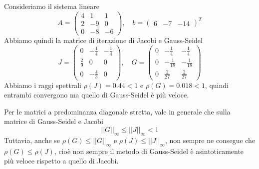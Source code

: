 \documentclass[a4paper]{article}
\begin{document}
\begin{snippetexample}{}
    Consideriamo il sistema lineare
    \[
        A =
        \begin{pmatrix}
            4 & 1 & 1 \\
            2 & -9 & 0 \\
            0 & -8 & -6
        \end{pmatrix}, \quad b=
        \begin{pmatrix}
            6 & -7 & -14
        \end{pmatrix}^T
    \]
    Abbiamo quindi la matrice di iterazione di Jacobi e Gauss-Seidel
    \[
        J =
        \begin{pmatrix}
            0 & -\frac14 & -\frac14 \\
            \frac29 & 0 & 0 \\
            0 & -\frac43 & 0
        \end{pmatrix}, \quad
        G =
        \begin{pmatrix}
            0 & -\frac14 & -\frac14 \\
            0 & -\frac{1}{18} & -\frac{1}{18} \\
            0 & \frac{2}{27} & \frac{2}{27}
        \end{pmatrix}
    \]
    Abbiamo i raggi spettrali \(\rho(J) = 0.44 < 1\)
    e \(\rho(G) = 0.018 < 1\), quindi entrambi convergono ma quello di Gauss-Seidel
    è più veloce.
\end{snippetexample}

Per le matrici a predominanza diagonale stretta, vale in generale che
sulla matrice di Gauss-Seidel e Jacobi
\[
    ||G||_{\infty} \leq ||J||_{\infty} < 1
\]
Tuttavia, anche se \(\rho(G) \leq ||G||_{\infty}\)
e \(\rho(J) \leq ||J||_{\infty}\), non sempre ne consegue che
\(\rho(G) \leq \rho(J)\), cioè non sempre
il metodo di Gauss-Seidel è asintoticamente
più veloce rispetto a quello di Jacobi.
\end{document}
